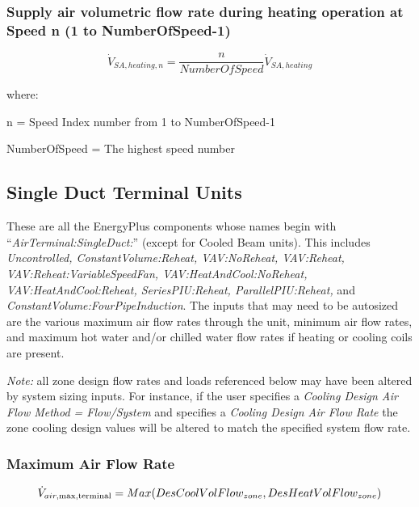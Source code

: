 \subsubsection{Supply air volumetric flow rate during heating operation at Speed n (1 to NumberOfSpeed-1)}\label{supply-air-volumetric-flow-rate-during-heating-operation-at-speed-n-1-to-numberofspeed-1}

\begin{equation}
\dot V_{SA,heating,n} = \frac{n}{NumberOfSpeed}\dot V_{SA,heating}
\end{equation}

where:

n = Speed Index number from 1 to NumberOfSpeed-1

NumberOfSpeed = The highest speed number

\subsection{Single Duct Terminal Units}\label{single-duct-terminal-units}

These are all the EnergyPlus components whose names begin with ``\emph{AirTerminal:SingleDuct:}'' (except for Cooled Beam units). This includes \emph{Uncontrolled, ConstantVolume:Reheat, VAV:NoReheat, VAV:Reheat, VAV:Reheat:VariableSpeedFan, VAV:HeatAndCool:NoReheat, VAV:HeatAndCool:Reheat, SeriesPIU:Reheat, ParallelPIU:Reheat,} and \emph{ConstantVolume:FourPipeInduction}. The inputs that may need to be autosized are the various maximum air flow rates through the unit, minimum air flow rates, and maximum hot water and/or chilled water flow rates if heating or cooling coils are present.

\emph{Note:} all zone design flow rates and loads referenced below may have been altered by system sizing inputs. For instance, if the user specifies a \emph{Cooling Design Air Flow Method = Flow/System} and specifies a \emph{Cooling Design Air Flow Rate} the zone cooling design values will be altered to match the specified system flow rate.

\subsubsection{Maximum Air Flow Rate}\label{maximum-air-flow-rate-3}

\begin{equation}
{\dot V_{air,\max ,{\rm{terminal}}}} = Max(DesCoolVolFlow_{zone},DesHeatVolFlow_{zone})
\end{equation}

